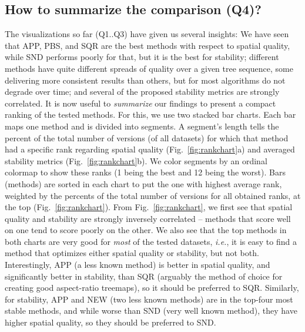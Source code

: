 \subsection{How to summarize the comparison (Q4)?}
\label{sec:q4}
%
%
The visualizations so far (Q1..Q3) have given us several insights: We have seen that APP, PBS, and SQR are the best methods with respect to spatial quality, while SND performs poorly for that, but it is the best for stability; different methods have quite different spreads of quality over a given tree sequence, some delivering more consistent results than others, but for most algorithms do not degrade over time; and several of the proposed stability metrics are strongly correlated. It is now useful to \emph{summarize} our findings to present a compact ranking of the tested methods. For this, we use two stacked bar charts. Each bar maps one method and is divided into segments. A segment's length tells the percent of the total number of versions (of all datasets) for which that method had a specific rank regarding spatial quality (Fig.~\ref{fig:rankchart}a) and averaged stability metrics (Fig.~\ref{fig:rankchart}b). We color segments by an ordinal colormap to show these ranks (1 being the best and 12 being the worst). Bars (methods) are sorted in each chart to put the one with highest average rank, weighted by the percents of the total number of versions for all obtained ranks, at the top (Fig.~\ref{fig:rankchart}). From Fig.~\ref{fig:rankchart}, we first see that spatial quality and stability are strongly inversely correlated -- methods that score well on one tend to score poorly on the other. We also see that the top methods in both charts are very good for \emph{most} of the tested datasets, \emph{i.e.}, it is easy to find a method that optimizes either spatial quality or stability, but not both. Interestingly, APP (a less known method) is better in spatial quality, and significantly better in stability, than SQR (arguably the method of choice for creating good aspect-ratio treemaps), so it should be preferred to SQR. Similarly, for stability, APP and NEW (two less known methods) are in the top-four most stable methods, and while worse than SND (very well known method), they have higher spatial quality, so they should be preferred to SND.

